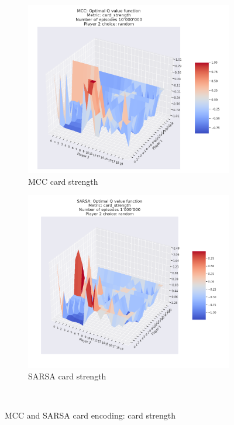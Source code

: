 \begin{figure}[ht!]
    \begin{subfigure}{0.5\textwidth}
        \includegraphics[width=1\linewidth]{Figures/mcc_card_strength_10000000_random} 
        \caption[MCC card strength]{MCC card strength}
        \label{fig:mcc card strength}
    \end{subfigure}
    \begin{subfigure}{0.5\textwidth}
        \includegraphics[width=1\linewidth]{Figures/SARSA_card_strength_1000000_random}
        \caption[SARSA card strength]{SARSA card strength}
        \label{fig:sarsa card strength}
    \end{subfigure} \\
    \caption{MCC and SARSA card encoding: card strength}
\label{fig:MCC and SARSA card encoding: card strength}
\end{figure}


